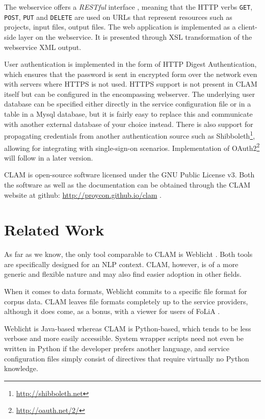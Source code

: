 \documentclass[11pt]{article}
\begin{document}
The webservice offers a \emph{RESTful} interface \cite{REST}, meaning that the HTTP
verbs \texttt{GET}, \texttt{POST}, \texttt{PUT} and \texttt{DELETE} are used on
URLs that represent resources such as projects, input files, output files. The
web application is implemented as a client-side layer on the webservice. It is
presented through XSL transformation \cite{XSLT} of the webservice XML output.

User authentication is implemented in the form of HTTP Digest Authentication,
which ensures that the password is sent in encrypted form over the network even
with servers where HTTPS is not used. HTTPS support is not present in CLAM
itself but can be configured in the encompassing webserver. The underlying user
database can be specified either directly in the service configuration file or
in a table in a Mysql database, but it is fairly easy to replace this and
communicate with another external database of your choice instead. There is
also support for propagating credentials from another authentication source
such as Shibboleth\footnote{\url{http://shibboleth.net}}, allowing for integrating with single-sign-on scenarios.
Implementation of OAuth2\footnote{\url{http://oauth.net/2/}} will follow in a later version.

CLAM is open-source software licensed under the GNU Public License v3. Both the
software as well as the documentation can be obtained through the CLAM
website at github: \url{http://proycon.github.io/clam} .

\section{Related Work}

As far as we know, the only tool comparable to CLAM is Weblicht
\cite{WEBLICHT}. Both tools are specifically designed for an NLP context. CLAM,
however, is of a more generic and flexible nature and may also find easier
adoption in other fields.

When it comes to data formats, Weblicht commits to a specific file format for
corpus data. CLAM leaves file formats completely up to the service providers,
although it does come, as a bonus, with a viewer for users of FoLiA \cite{FOLIA}.

Weblicht is Java-based whereas CLAM is Python-based, which tends to be less
verbose and more easily accessible. System wrapper scripts need not even be
written in Python if the developer prefers another language, and service
configuration files simply consist of directives that require virtually
no Python knowledge.
\end{document}
